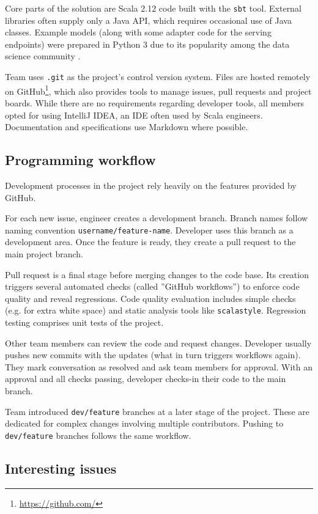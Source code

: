 Core parts of the solution are Scala 2.12 code built with the \texttt{sbt} tool.
External libraries often supply only a Java API, which requires occasional use of Java classes.
Example models (along with some adapter code for the serving endpoints) were prepared in Python 3 due to its popularity among the data science community \cite{srinath2017python}.

Team uses \texttt{.git} as the project's control version system.
Files are hosted remotely on GitHub\footnote{\href{https://github.com/}{https://github.com/}}, which also provides tools to manage issues, pull requests and project boards.
While there are no requirements regarding developer tools, all members opted for using IntelliJ IDEA, an IDE often used by Scala engineers.
Documentation and specifications use Markdown where possible.

\subsection{Programming workflow}

Development processes in the project rely heavily on the features provided by GitHub.

For each new issue, engineer creates a development branch. Branch names follow naming convention \texttt{username/feature-name}.
Developer uses this branch as a development area.
Once the feature is ready, they create a pull request to the main project branch.

Pull request is a final stage before merging changes to the code base.
Its creation triggers several automated checks (called ''GitHub workflows'') to enforce code quality and reveal regressions.
Code quality evaluation includes simple checks (e.g. for extra white space) and static analysis tools like \texttt{scalastyle}.
Regression testing comprises unit tests of the project.

Other team members can review the code and request changes.
Developer usually pushes new commits with the updates (what in turn triggers workflows again).
They mark conversation as resolved and ask team members for approval.
With an approval and all checks passing, developer checks-in their code to the main branch.

Team introduced \texttt{dev/feature} branches at a later stage of the project.
These are dedicated for complex changes involving multiple contributors.
Pushing to \texttt{dev/feature} branches follows the same workflow.

\subsection{Interesting issues}

